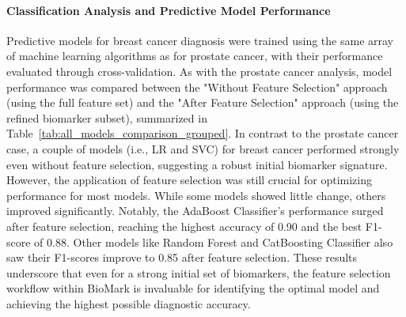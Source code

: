 \documentclass[journal]{IEEEtran}
\begin{document}
\paragraph{Classification Analysis and Predictive Model Performance}
Predictive models for breast cancer diagnosis were trained using the same array of machine learning algorithms as for prostate cancer, with their performance evaluated through cross-validation. As with the prostate cancer analysis, model performance was compared between the "Without Feature Selection" approach (using the full feature set) and the "After Feature Selection" approach (using the refined biomarker subset), summarized in Table~\ref{tab:all_models_comparison_grouped}. In contrast to the prostate cancer case, a couple of models (i.e., LR and SVC) for breast cancer performed strongly even without feature selection, suggesting a robust initial biomarker signature. However, the application of feature selection was still crucial for optimizing performance for most models. While some models showed little change, others improved significantly. Notably, the AdaBoost Classifier’s performance surged after feature selection, reaching the highest accuracy of 0.90 and the best F1-score of 0.88. Other models like Random Forest and CatBoosting Classifier also saw their F1-scores improve to 0.85 after feature selection. These results underscore that even for a strong initial set of biomarkers, the feature selection workflow within BioMark is invaluable for identifying the optimal model and achieving the highest possible diagnostic accuracy.
\end{document}
